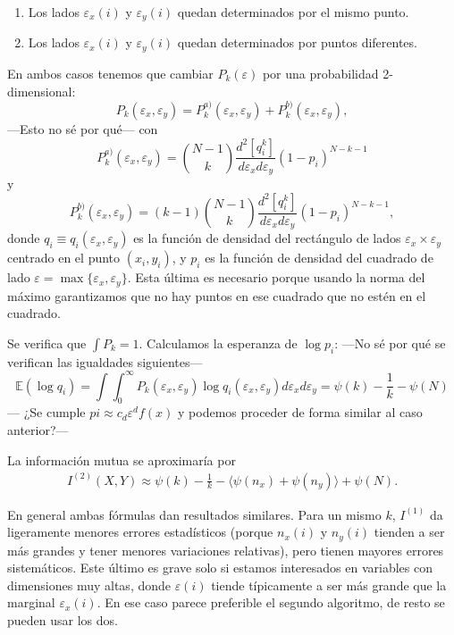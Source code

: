 \documentclass[10pt,a4paper]{article} %
\theoremstyle{definition}
\begin{document}
\begin{enumerate}[label={\alph*)}]
\item Los lados $\varepsilon_x(i)$ y $\varepsilon_y(i)$ quedan determinados por el mismo punto.
\item Los lados $\varepsilon_x(i)$ y $\varepsilon_y(i)$ quedan determinados por puntos diferentes.
\end{enumerate}

En ambos casos tenemos que cambiar $P_k(\varepsilon)$ por una probabilidad 2-dimensional:\[
P_k(\varepsilon_x, \varepsilon_y) = P_k^{a)}(\varepsilon_x, \varepsilon_y) + P_k^{b)}(\varepsilon_x, \varepsilon_y),
\]
---Esto no sé por qué---
con \[
P_k^{a)}(\varepsilon_x, \varepsilon_y) = \binom{N-1}{k} \frac{d^2[q_i^k]}{d\varepsilon_x d \varepsilon_y}(1-p_i)^{N-k-1}
\]
y\[
P_k^{b)}(\varepsilon_x, \varepsilon_y) = (k-1)\binom{N-1}{k} \frac{d^2[q_i^k]}{d\varepsilon_x d \varepsilon_y}(1-p_i)^{N-k-1},
\]
donde $q_i \equiv q_i(\varepsilon_x, \varepsilon_y)$ es la función de densidad del rectángulo de lados $\varepsilon_x \times \varepsilon_y$ centrado en el punto $(x_i, y_i)$, y $p_i$ es la función de densidad del cuadrado de lado $\varepsilon = \max \{\varepsilon_x, \varepsilon_y\}$. Esta última es necesario porque usando la norma del máximo garantizamos que no hay puntos en ese cuadrado que no estén en el cuadrado.

Se verifica que $\int P_k =1$. Calculamos la esperanza de $\log p_i$:
---No sé por qué se verifican las igualdades siguientes---
\[
\mathbb{E}(\log q_i) = \int \int_0^{\infty} P_k(\varepsilon_x, \varepsilon_y) \log q_i(\varepsilon_x, \varepsilon_y) d \varepsilon_x d\varepsilon_y
= \psi(k) - \frac{1}{k} - \psi(N)
\]
--- ¿Se cumple $pi\approx c_d\varepsilon^df(x)$ y podemos proceder de forma similar al caso anterior?---

La información mutua se aproximaría por
\begin{align}
I^{(2)}(X,Y) \approx \psi(k) - \frac{1}{k} - \langle \psi(n_x) + \psi(n_y) \rangle + \psi(N). \label{eq:est2}
\end{align}


En general ambas fórmulas dan resultados similares. Para un mismo $k$, $I^{(1)}$ da ligeramente menores errores estadísticos (porque $n_x(i)$ y $n_y(i)$ tienden a ser más grandes y tener menores variaciones relativas), pero tienen mayores errores sistemáticos. Este último es grave solo si estamos interesados en variables con dimensiones muy altas, donde $\varepsilon(i)$ tiende típicamente a ser más grande que la marginal $\varepsilon_x(i)$. En ese caso parece preferible el segundo algoritmo, de resto se pueden usar los dos.
\end{document}
